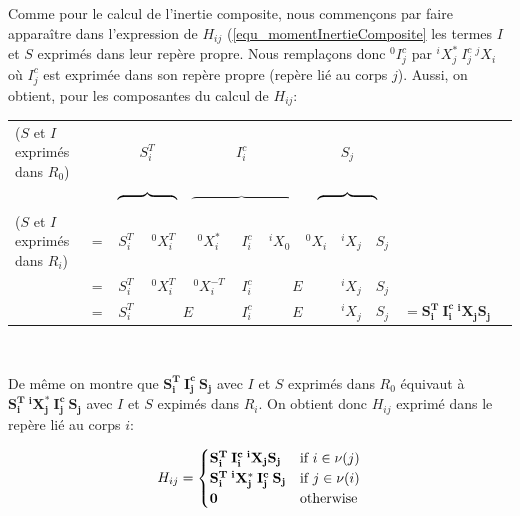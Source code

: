 \documentclass{report}
\begin{document}
Comme pour le calcul de l'inertie composite, nous commençons par faire apparaître dans l'expression de $H_{ij}$ (\eqref{equ_momentInertieComposite} les termes $I$ et $S$ exprimés dans leur repère propre. Nous remplaçons donc ${^0I_j^c}$ par ${^iX_j^*} \: {I_j^c} \: {^jX_i}$ où ${I_j^c}$ est exprimée dans son repère propre (repère lié au corps $j$). Aussi, on obtient, pour les composantes du calcul de $H_{ij}$:\\

\begin{tabular}{lccccccccccc}
($S$ et $I$ exprimés dans $R_0$) &   &\multicolumn{2}{c}{$ S_i^T $}&\multicolumn{3}{c}{$ I_i^c $}&\multicolumn{3}{c}{$ {S_j} $} \\ 
                                                        &   &\multicolumn{2}{c}{$\overbrace{\hspace{1.5cm}}$}&\multicolumn{3}{c}{$\overbrace{\hspace{3cm}}$}&\multicolumn{3}{c}{$\overbrace{\hspace{1.5cm}}$} \\ 
($S$ et $I$ exprimés dans $R_i$) & = &$ S_i^T $&$ ^0X_i^T $&$ ^0X_i^* $&$ I_i^c $&$ ^iX_0 $&$ ^0X_i $&$ ^iX_j $&$ S_j $ \\ 
                                                       & = &$ S_i^T $&$ ^0X_i^T $&$ ^0X_i^{-T} $&$ I_i^c $& \multicolumn{2}{c}{$E$} &$ ^iX_j $&$ S_j $ \\ 
                                                       & = &$ S_i^T $&\multicolumn{2}{c}{$E$}&$ I_i^c $& \multicolumn{2}{c}{$E$} &$ ^iX_j $&$ S_j $ & $ \mathbf{= {S_i^T} \: {I_i^c} \: {^iX_j} S_j} $ \\ 
\end{tabular} \\

\begin{flushleft}
De même on montre que $\mathbf{S_i^T \: I_j^c \: S_j}$ avec $I$ et $S$ exprimés dans $R_0$ équivaut à $\mathbf{{S_i^T} \: {^iX_j^*} \: {I_j^c} \: S_j}$ avec $I$ et $S$ expimés dans $R_i$. On obtient donc $H_{ij}$ exprimé dans le repère lié au corps $i$:
\end{flushleft}

\begin{equation}
H_{ij} = 
\begin{cases}
\mathbf{{S_i^T} \: {I_i^c} \: {^iX_j} S_j} & \textnormal{if } i \in \nu(j) \\
\mathbf{{S_i^T} \: {^iX_j^*} \: {I_j^c} \: S_j} & \textnormal{if } j \in \nu(i) \\
\mathbf{0} & \textnormal{otherwise}
\end{cases} \label{equ_momentInertieCompositeLocal}
\end{equation}
\end{document}
